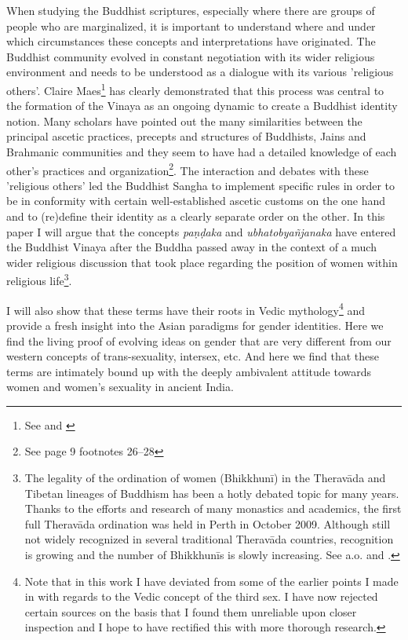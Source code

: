 When studying the Buddhist scriptures, especially where there are groups of people who are marginalized, it is important to understand where and under which circumstances these concepts and interpretations have originated. The Buddhist community evolved in constant negotiation with its wider religious environment and needs to be understood as a dialogue with its various 'religious others'. Claire Maes\footnote{See \cite{maes} and \cite{maes2016}} has clearly demonstrated that this process was central to the formation of the Vinaya as an ongoing dynamic to create a Buddhist identity notion. Many scholars have pointed out the many similarities between the principal ascetic practices, precepts and structures of Buddhists, Jains and Brahmanic communities and they seem to have had a detailed knowledge of each other's practices and organization\footnote{See \cite{maes2016} page 9 footnotes 26–28}. The interaction and debates with these 'religious others' led the Buddhist Sangha to implement specific rules in order to be in conformity with certain well-established ascetic customs on the one hand and to (re)define their identity as a clearly separate order on the other. In this paper I will argue that the concepts {\em paṇḍaka} and {\em ubhatob­yañ­janaka} have entered the Buddhist Vinaya after the Buddha passed away in the context of a much wider religious discussion that took place regarding the position of women within religious life\footnote{The legality of the ordination of women (Bhikkhunī) in the Theravāda and Tibetan lineages of Buddhism has been a hotly debated topic for many years. Thanks to the efforts and research of many monastics and academics, the first full Theravāda ordination was held in Perth in October 2009. Although still not widely recognized in several traditional Theravāda countries, recognition is growing and the number of Bhikkhunīs is slowly increasing. See a.o. \cite{sujato2009} and \cite{analayo2013}.}. 

I will also show that these terms have their roots in Vedic mythology\footnote{Note that in this work I have deviated from some of the earlier points I made in \cite{vimala} with regards to the Vedic concept of the third sex. I have now rejected certain sources on the basis that I found them unreliable upon closer inspection and I hope to have rectified this with more thorough research.} and provide a fresh insight into the Asian paradigms for gender identities. Here we find the living proof of evolving ideas on gender that are very different from our western concepts of trans-sexuality, intersex, etc. And here we find that these terms are intimately bound up with the deeply ambivalent attitude towards women and women's sexuality in ancient India.

